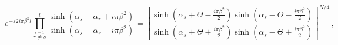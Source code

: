 \begin{equation}
e^{-\varepsilon2i\pi \beta ^2 l}\prod _{{\stackrel{r=1}{r\not= s}}}^l \frac {\sinh (\alpha _s -\alpha _r +i\pi \beta ^2)}{\sinh (\alpha _s -\alpha _r -i\pi \beta ^2)}=\left [\frac
{\sinh \left (\alpha _s +\Theta -\frac {i\pi \beta ^2}{2}\right)\sinh \left(\alpha _s -\Theta -\frac {i\pi\beta ^2}{2}\right)}
{\sinh \left (\alpha _s +\Theta +\frac {i\pi \beta ^2}{2}\right)\sinh
\left (\alpha _s -\Theta +\frac {i\pi \beta ^2}{2}\right)}
\right]^{N/4} \, ,
\label{Bethe}
\end{equation}

